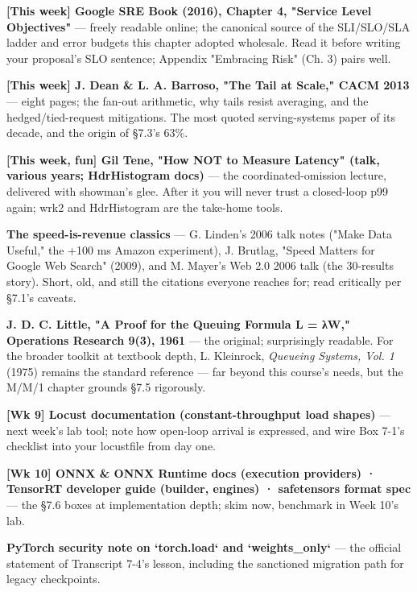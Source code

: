 \begin{tbbitemize}
  \item \textbf{[This week] Google SRE Book (2016), Chapter 4, "Service Level Objectives"} — freely readable online; the canonical source of the SLI/SLO/SLA ladder and error budgets this chapter adopted wholesale. Read it before writing your proposal's SLO sentence; Appendix "Embracing Risk" (Ch. 3) pairs well.
  \item \textbf{[This week] J. Dean \& L. A. Barroso, "The Tail at Scale," CACM 2013} — eight pages; the fan-out arithmetic, why tails resist averaging, and the hedged/tied-request mitigations. The most quoted serving-systems paper of its decade, and the origin of §7.3's 63\%.
  \item \textbf{[This week, fun] Gil Tene, "How NOT to Measure Latency" (talk, various years; HdrHistogram docs)} — the coordinated-omission lecture, delivered with showman's glee. After it you will never trust a closed-loop p99 again; wrk2 and HdrHistogram are the take-home tools.
  \item \textbf{The speed-is-revenue classics} — G. Linden's 2006 talk notes ("Make Data Useful," the +100 ms Amazon experiment), J. Brutlag, "Speed Matters for Google Web Search" (2009), and M. Mayer's Web 2.0 2006 talk (the 30-results story). Short, old, and still the citations everyone reaches for; read critically per §7.1's caveats.
  \item \textbf{J. D. C. Little, "A Proof for the Queuing Formula L = λW," Operations Research 9(3), 1961} — the original; surprisingly readable. For the broader toolkit at textbook depth, L. Kleinrock, \textit{Queueing Systems, Vol. 1} (1975) remains the standard reference — far beyond this course's needs, but the M/M/1 chapter grounds §7.5 rigorously.
  \item \textbf{[Wk 9] Locust documentation (constant-throughput load shapes)} — next week's lab tool; note how open-loop arrival is expressed, and wire Box 7-1's checklist into your locustfile from day one.
  \item \textbf{[Wk 10] ONNX \& ONNX Runtime docs (execution providers) · TensorRT developer guide (builder, engines) · safetensors format spec} — the §7.6 boxes at implementation depth; skim now, benchmark in Week 10's lab.
  \item \textbf{PyTorch security note on `torch.load` and `weights\_only`} — the official statement of Transcript 7-4's lesson, including the sanctioned migration path for legacy checkpoints.
\end{tbbitemize}

